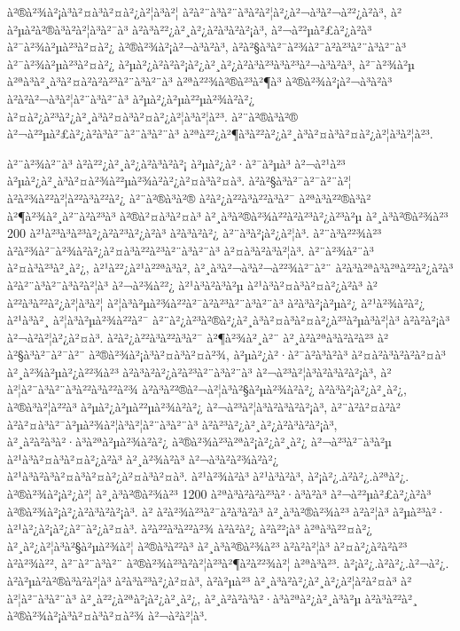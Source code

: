 à²®à²¾à²¡à³à²¤à³à²¤à²¿à²¦à³à²¦ à²à²¨à³à²¨à³à²à²¦à²¿à²¬à³à²¬à²²¿à²à³, à²à²µà²\circ à²®à³à²à²¦à³à²¯à³ à²à³à²²¿à²¸à²¿à²à³à²à²¡à³, à²¬à²²µà²£à²¿à²à³ à²¯à²¾à²µà²³à²¤à²¿ à²®à²¾à²¡à²¬à³à²à³, à²à²§à³à²¯à²¾à²¯à²à²³à²¨à³à²¨à³ à²¯à²¾à²µà²³à²¤à²¿ à²µà²¿à²à²à²¡à²¿à²¸à²¿à²à³à²³à³à²³à²¬à³à²à³, à²¯à²¾à²µ à²ªà³à²¸à³à²¤à²à²à²³à²¨à³à²¨à³ à²ªà²²¾à²®à²³à²¶à³ à²®à²¾à²¡à²¬à³à²à³ à²à²à²¬à³à²¦à²¨à³à²¨à³ à²µà²¿à²µà²²µà²¾à²à²¿ à²¤à²¿à²³à²¿à²¸à³à²¤à³à²¤à²¿à²¦à³à²¦à²³. à²¨à²®à³à²® à²¬à²²µà²£à²¿à²à³à²¯à²¨à³à²¨à³ à²ªà²²¿à²¶à³à²²à²¿à²¸à³à²¤à³à²¤à²¿à²¦à³à²¦à²³. 

à²¨à²¾à²¨à³ à²à²²¿à²¸à²¿à²à³à²à²¡ à²µà²¿à²·à²¯à²µà³ à²¬à²¹à²³ à²µà²¿à²¸à³à²¤à²¾à²²µà²¾à²à²¿à²¤à³à²¤à³. à²à²§à³à²¯à²¯à²¨à²¦ à²à²¾à²²à²¦à²²à³à²²à²¿ à²¨à²®à³à²® à²à²¿à²²à³à²²à³à²¯ à²ªà³à²²®à³à² à²¶à²¾à²¸à²¨à²à²³à³ à²®à²¤à³à²¤à³ à²¸à³à²®à²¾à²²à²à²³à²¿à²³à²µ à²¸à³à²®à²¾à²³ 200 à²¹à²³à³à²³à²¿à²à²³à²¿à²à³ à²­à³à²à²¿ à²¨à³à²¡à²¿à²¦à³. à²¨à³à²²¾à²³ à²à²¾à²¯à²¾à²à²¿à²¤à³à²²à²³à²¨à³à²¨à³ à²¤à³à²à³à²¦à³. à²¨à²¾à²¨à³ à²¤à³à²³à²¸à²¿, à²¹à²²¿à²¹à²²ªà³à²\circ, à²¸à³à²¬à³à²¬à²²¾à²¯à²¨ à²à³à²ªà³à²ªà²²à²¿à²à³ à²à²¨à³à²¨à³à²à²¦à³ à²¬à²¾à²²¿ à²¹à³à²à³à²µ à²¹à³à²¤à³à²¤à²¿à²à³ à²à²²à³à²²à²¿à²¦à³à²¦ à²¦à³à²µà²¾à²²à²¯à²à²³à²¨à³à²¨à³ à²à³à²¡à²µà²¿ à²¹à²¾à²à²¿ à²¹à³à²¸ à²¦à³à²µà²¾à²²à²¯ à²¨à²¿à²³à²®à²¿à²¸à³à²¤à³à²¤à²¿à²³à²µà³à²¦à³ à²à²à²¡à³ à²¬à²à²¦à²¿à²¤à³. à²à²¿à²²à³à²²à³à²¯ à²¶à²¾à²¸à²¨ à²¸à²à²ªà³à²à²à²³ à²à²§à³à²¯à²¯à²¨ à²®à²¾à²¡à³à²¤à³à²¤à²¾, à²µà²¿à²·à²¯à²à³à²à³ à²¤à²à³à²à²à²¤à³ à²¸à²¾à²µà²¿à²²¾à²³ à²à³à²à²¿à²à²³à²¨à³à²¨à³ à²¬à²³à²¦à³à²à³à²à²¡à³, à²à²¦à²¨à³à²¨à³à²²à³à²²à²¾ à²à³à²²®à²¬à²¦à³à²§à²µà²¾à²à²¿ à²à³à²¡à²¿à²¸à²¿, à²®à³à²¦à²²à³ à²µà²¿à²µà²²µà²¾à²à²¿ à²¬à²³à²¦à³à²à³à²à²¡à³, à²¨à²à²¤à²\circ à²à²à²¤à³à²¯à²µà²¾à²¦à³à²¦à²¨à³à²¨à³ à²à²³à²¿à²¸à²¿à²à³à²à²¡à³, à²¸à²à²à³à²·à³à²ªà²µà²¾à²à²¿ à²®à²¾à²³à²ªà²¡à²¿à²¸à²¿ à²¬à²³à²¯à³à²µ à²¹à³à²¤à³à²¤à²¿à²à³ à²¸à²¾à²à³ à²¬à³à²à²¾à²à²¿ à²¹à³à²à³à²¤à³à²¤à²¿à²¤à³à²¤à³. à²¹à²¾à²à³ à²¹à³à²à³, à²¡à²¿.à²à²¿.à²ªà²¿. à²®à²¾à²¡à²¿à²¦ à²¸à³à²®à²¾à²³ 1200 à²ªà³à²à²à²³à²·à³à²à³ à²¬à²²µà²£à²¿à²à³ à²®à²¾à²¡à²¿à²à³à²à²¡à³. à² à²à²¾à²³à²¯à²à³à²à³ à²¸à³à²®à²¾à²³ à²à²¦à³ à²µà²³à²· à²¹à²¿à²¡à²¿à²¯à²¿à²¤à³. à²à²²à³à²²à²¾ à²à²à²¿ à²à²²¡à³ à²ªà³à²²¤à²¿ à²¸à²¿à²¦à³à²§à²µà²¾à²¦ à²®à³à²²à³ à²¸à³à²®à²¾à²³ à²à²à²¦à³ à²¤à²¿à²à²à²³ à²à²¾à²², à²¨à²¨à³à²¨ à²®à²¾à²³à²à²¦à²³à²¶à²à²²¾à²¦ à²ªà³à²³. à²¡à²¿.à²à²¿.à²¬à²¿. à²à²µà²\circ à²®à³à²à²¦à³ à²à³à²³à²¿à²¤à³, à²à²µà²³ à²¸à³à²à²¿à²¸à²¿à²¦à²à²¤à³ à²à²¦à²¨à³à²¨à³ à²¸à²²¿à²ªà²¡à²¿à²¸à²¿, à²¸à²à²à³à²·à³à²ªà²¿à²¸à³à²µ à²à³à²²à²¸ à²®à²¾à²¡à³à²¤à³à²¤à²¾ à²¬à²à²¦à³. 

